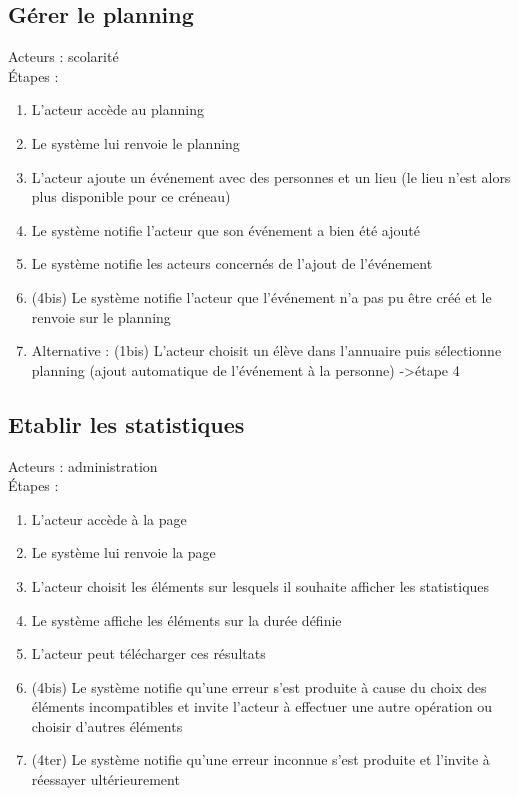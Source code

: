\documentclass{scrreprt}
\begin{document}
\subsection{Gérer le planning}
Acteurs : scolarité
\\
\'Etapes : 
\begin{enumerate}
\item L’acteur accède au planning
\item Le système lui renvoie le planning
\item L’acteur ajoute un événement avec des personnes et un lieu (le lieu n’est alors plus disponible pour ce créneau) 
\item Le système notifie l’acteur que son événement a bien été ajouté
\item Le système notifie les acteurs concernés de l’ajout de l’événement
\item (4bis) Le système notifie l’acteur que l’événement n’a pas pu être créé et le renvoie sur le planning
\item Alternative : (1bis) L’acteur choisit un élève dans l’annuaire puis sélectionne planning (ajout automatique de l’événement à la personne) -\textgreater étape 4
\end{enumerate}
\subsection{Etablir les statistiques}
Acteurs : administration
\\
\'Etapes : 
\begin{enumerate}
\item L’acteur accède à la page
\item Le système lui renvoie la page
\item L’acteur choisit les éléments sur lesquels il souhaite afficher les statistiques
\item Le système affiche les éléments sur la durée définie
\item L’acteur peut télécharger ces résultats
\item (4bis) Le système notifie qu’une erreur s’est produite à cause du choix des éléments incompatibles et invite l’acteur à effectuer une autre opération ou choisir d’autres éléments
\item (4ter) Le système notifie qu’une erreur inconnue s’est produite et l’invite à réessayer ultérieurement
\end{enumerate}
\end{document}
